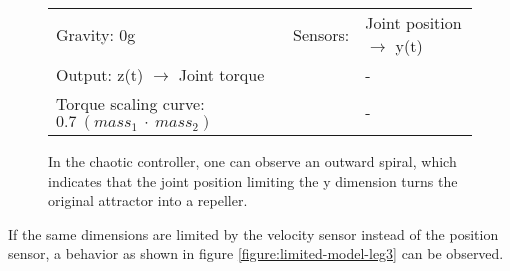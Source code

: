\documentclass[main]{subfiles}
\begin{document}
\begin{figure}[H]
	\centering
	\begin{minipage}{1.3\textwidth}
	\hspace*{-5em}
	\end{minipage}
	\caption[Joint position \(\rightarrow\) y(t) limited chaotic controller controlling model leg]{In the chaotic controller, one can observe an outward spiral, which indicates that the joint position limiting the y dimension turns the original attractor into a repeller.}
	\begin{tabular}{l|ll}
	\hline 
	Gravity: 0g  & Sensors: & Joint position \(\rightarrow\) y(t)\\
	 Output: z(t) \(\rightarrow\) Joint torque & & - \\
	  Torque scaling curve: \(0.7~(mass_1~\cdot~mass_2)\) & & - \\
	  \hline
	\end{tabular}

	\label{figure:limited-model-leg2}
\end{figure}

If the same dimensions are limited by the velocity sensor instead of the position sensor, a behavior as shown in figure \ref{figure:limited-model-leg3} can be observed.
\end{document}

